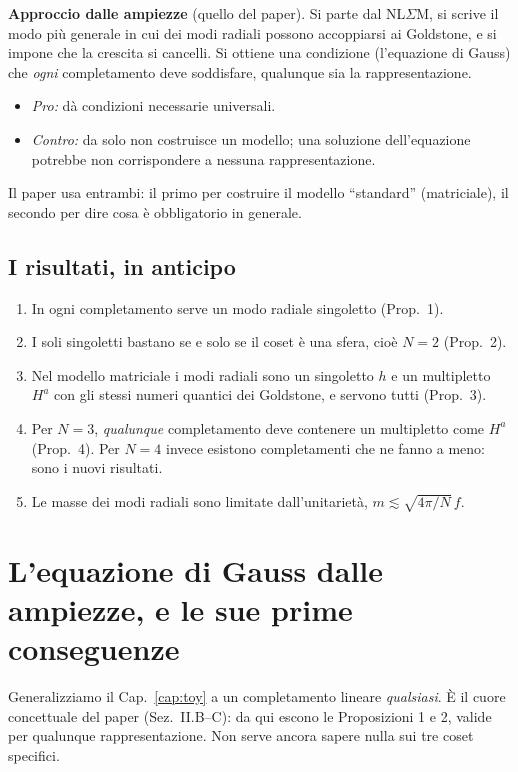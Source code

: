 \documentclass[11pt,a4paper]{article}
\numberwithin{equation}{section}
\theoremstyle{remark}
\begin{document}
\textbf{Approccio dalle ampiezze} (quello del paper). Si parte dal NL$\Sigma$M, si scrive il modo più generale in cui dei modi radiali possono accoppiarsi ai Goldstone, e si impone che la crescita si cancelli. Si ottiene una condizione (l'equazione di Gauss) che \emph{ogni} completamento deve soddisfare, qualunque sia la rappresentazione.
\begin{itemize}[nosep]
\item \emph{Pro:} dà condizioni necessarie universali.
\item \emph{Contro:} da solo non costruisce un modello; una soluzione dell'equazione potrebbe non corrispondere a nessuna rappresentazione.
\end{itemize}
Il paper usa entrambi: il primo per costruire il modello ``standard'' (matriciale), il secondo per dire cosa è obbligatorio in generale.

\subsection{I risultati, in anticipo}

\begin{enumerate}
\item In ogni completamento serve un modo radiale singoletto (Prop.~1).
\item I soli singoletti bastano se e solo se il coset è una sfera, cioè $N=2$ (Prop.~2).
\item Nel modello matriciale i modi radiali sono un singoletto $h$ e un multipletto $H^a$ con gli stessi numeri quantici dei Goldstone, e servono tutti (Prop.~3).
\item Per $N=3$, \emph{qualunque} completamento deve contenere un multipletto come $H^a$ (Prop.~4). Per $N=4$ invece esistono completamenti che ne fanno a meno: sono i nuovi risultati.
\item Le masse dei modi radiali sono limitate dall'unitarietà, $m\lesssim\sqrt{4\pi/N}\,f$.
\end{enumerate}

\section{L'equazione di Gauss dalle ampiezze, e le sue prime conseguenze}
\label{cap:gauss}

\begin{dove}
Generalizziamo il Cap.~\ref{cap:toy} a un completamento lineare \emph{qualsiasi}. È il cuore concettuale del paper (Sez.~II.B--C): da qui escono le Proposizioni 1 e 2, valide per qualunque rappresentazione. Non serve ancora sapere nulla sui tre coset specifici.
\end{dove}
\end{document}
